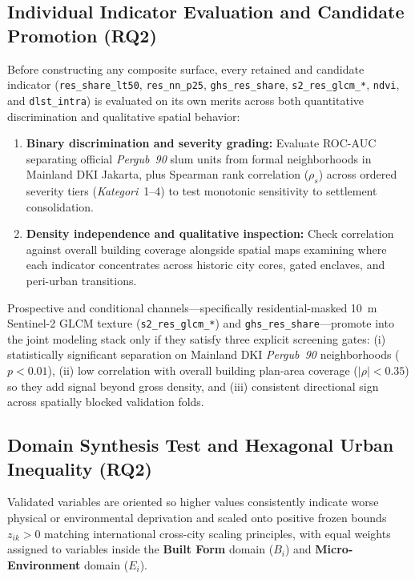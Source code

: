 \subsection{Individual Indicator Evaluation and Candidate Promotion (RQ2)}
Before constructing any composite surface, every retained and candidate indicator (\texttt{res\_share\_lt50}, \texttt{res\_nn\_p25}, \texttt{ghs\_res\_share}, \texttt{s2\_res\_glcm\_*}, \texttt{ndvi}, and \texttt{dlst\_intra}) is evaluated on its own merits across both quantitative discrimination and qualitative spatial behavior:
\begin{enumerate}
    \item \textbf{Binary discrimination and severity grading:} Evaluate ROC-AUC separating official \textit{Pergub~90} slum units from formal neighborhoods in Mainland DKI Jakarta, plus Spearman rank correlation ($\rho_s$) across ordered severity tiers (\textit{Kategori}~1--4) to test monotonic sensitivity to settlement consolidation.
    \item \textbf{Density independence and qualitative inspection:} Check correlation against overall building coverage alongside spatial maps examining where each indicator concentrates across historic city cores, gated enclaves, and peri-urban transitions.
\end{enumerate}

Prospective and conditional channels---specifically residential-masked 10~m Sentinel-2 GLCM texture (\texttt{s2\_res\_glcm\_*}) and \texttt{ghs\_res\_share}---promote into the joint modeling stack only if they satisfy three explicit screening gates: (i) statistically significant separation on Mainland DKI \textit{Pergub~90} neighborhoods ($p < 0.01$), (ii) low correlation with overall building plan-area coverage ($|\rho| < 0.35$) so they add signal beyond gross density, and (iii) consistent directional sign across spatially blocked validation folds.

\subsection{Domain Synthesis Test and Hexagonal Urban Inequality (RQ2)}
Validated variables are oriented so higher values consistently indicate worse physical or environmental deprivation and scaled onto positive frozen bounds $z_{ik} > 0$ matching international cross-city scaling principles, with equal weights assigned to variables inside the \textbf{Built Form} domain ($B_i$) and \textbf{Micro-Environment} domain ($E_i$).

